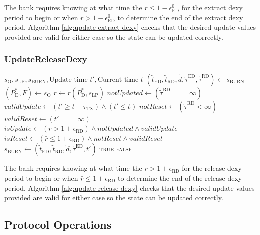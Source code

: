 \documentclass{ifcolog}
\newcommand{\Pdt}{P_{\mathrm{D}}^{*}}
\newcommand{\rr}{\bar{r}}
\newcommand{\slp}{s_{\mathrm{LP}}}
\newcommand{\soracle}{s_{\textrm{O}}}
\newcommand{\sburn}{s_{\textrm{BURN}}}
\newcommand{\tautx}{\tau_{\textrm{TX}}}
\newcommand{\epsilondexyzero}{\epsilon_{\textrm{ED}}^{0}}
\newcommand{\epsilonreleasedexy}{\epsilon_{\textrm{RD}}}
\begin{document}
The bank requires knowing at what time the $\rr \le 1 - \epsilondexyzero$ for the extract dexy period to begin 
or when $\rr > 1 - \epsilondexyzero$ to determine the end of the extract dexy period. 
Algorithm \ref{alg:update-extract-dexy} checks that the desired update values provided are valid for either case so the state 
can be updated correctly.

\newpage

\subsubsection{UpdateReleaseDexy}

\begin{algorithm}[H]
\caption{UpdateReleaseDexy}\label{alg:update-release-dexy}
\begin{algorithmic}[1]
\Require $\soracle, \slp, \sburn, \textrm{Update time } t', \textrm{Current time } t$
\State $(\tilde{t}_{\textrm{ED}}, \tilde{t}_{\textrm{RD}}, \tilde{d}, \tilde{\tau}^{\textrm{ED}}, \tilde{\tau}^{\textrm{RD}}) \gets \sburn$
\State $(\Pdt, F) \gets \soracle$ 
\State $\rr \gets \rr(\Pdt, \slp)$
\State $notUpdated \gets (\tilde{\tau}^{\textrm{RD}} == \infty)$
\State $validUpdate \gets (t' \ge t - \tautx) \land (t' \le t)$ 
\State $notReset \gets (\tilde{\tau}^{\textrm{RD}} < \infty)$
\State $validReset \gets (t' == \infty)$
\State $isUpdate \gets (\rr > 1  + \epsilonreleasedexy) \land notUpdated \land validUpdate$ 
\State $isReset \gets (\rr \le 1 + \epsilonreleasedexy) \land notReset \land validReset$
  \State $\sburn \gets (\tilde{t}_{\textrm{ED}}, \tilde{t}_{\textrm{RD}}, \tilde{d}, \tilde{\tau}^{\textrm{ED}}, t')$
  \State \Return \textsc{true}
\Else
  \State \Return \textsc{false}
\EndIf
\end{algorithmic}
\end{algorithm}

The bank requires knowing at what time the $\rr > 1  + \epsilonreleasedexy$ for the release dexy period to begin 
or when $\rr \le 1 + \epsilonreleasedexy$ to determine the end of the release dexy period. 
Algorithm \ref{alg:update-release-dexy} checks that the desired update values provided are valid for either case so the state 
can be updated correctly.

\newpage

\subsection{Protocol Operations}
\end{document}

